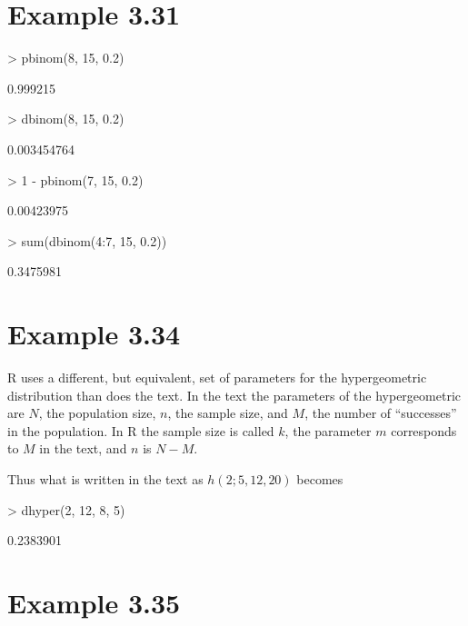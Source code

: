 \documentclass{book}
\begin{document}
\section{Example 3.31}
\begin{Schunk}
\begin{Sinput}
> pbinom(8, 15, 0.2)
\end{Sinput}
\begin{Soutput}
[1] 0.999215
\end{Soutput}
\begin{Sinput}
> dbinom(8, 15, 0.2)
\end{Sinput}
\begin{Soutput}
[1] 0.003454764
\end{Soutput}
\begin{Sinput}
> 1 - pbinom(7, 15, 0.2)
\end{Sinput}
\begin{Soutput}
[1] 0.00423975
\end{Soutput}
\begin{Sinput}
> sum(dbinom(4:7, 15, 0.2))
\end{Sinput}
\begin{Soutput}
[1] 0.3475981
\end{Soutput}
\end{Schunk}
\section{Example 3.34}
R uses a different, but equivalent, set of parameters for the
hypergeometric distribution than does
the text.  In the text the parameters of the hypergeometric are $N$,
the population size, $n$, the sample size, and $M$, the number of
``successes'' in the population.  In R the sample size is called $k$,
the parameter $m$ corresponds to $M$ in the text, and $n$ is $N-M$.

Thus what is written in the text as $h(2;5,12,20)$ becomes
\begin{Schunk}
\begin{Sinput}
> dhyper(2, 12, 8, 5)
\end{Sinput}
\begin{Soutput}
[1] 0.2383901
\end{Soutput}
\end{Schunk}

\section{Example 3.35}
\label{sec:xmp0335}
\end{document}

